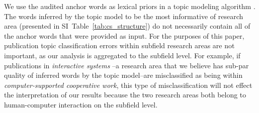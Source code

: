 \documentclass[reprint, twocolumn, aps, nofootinbib, superscriptaddress, longbibliography]{revtex4-1}
\begin{document}
We use the audited anchor words as lexical priors in a topic modeling algorithm \cite{gallagher2017anchored}. The words inferred by the topic model to be the most informative of research area (presented in SI~Table~\ref{tab:cs_structure}) do not necessarily contain all of the anchor words that were provided as input. For the purposes of this paper, publication topic classification errors within subfield research areas are not important, as our analysis is aggregated to the subfield level. For example, if publications in \emph{interactive systems} --a research area that we believe has sub-par quality of inferred words by the topic model--are misclassified as being within \emph{computer-supported cooperative work}, this type of misclassification will not effect the interpretation of our results because the two research areas both belong to human-computer interaction on the subfield level. 


\end{document}
